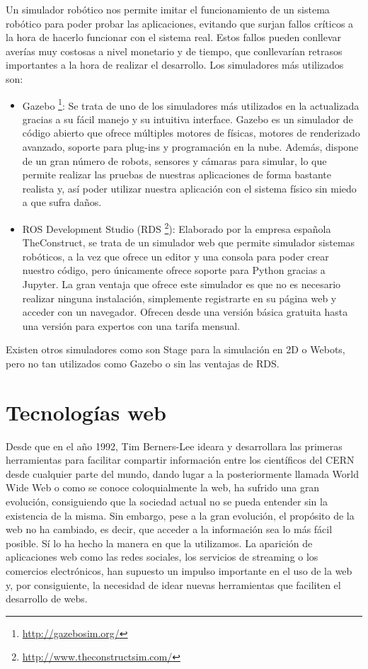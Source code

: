 Un simulador robótico nos permite imitar el funcionamiento de un sistema robótico para poder probar las aplicaciones, evitando que surjan fallos críticos a la hora de hacerlo funcionar con el sistema real. Estos fallos pueden conllevar averías muy costosas a nivel monetario y de tiempo, que conllevarían retrasos importantes a la hora de realizar el desarrollo. Los simuladores más utilizados son:
\begin{itemize}
	\item Gazebo \footnote{\url{http://gazebosim.org/}}: Se trata de uno de los simuladores más utilizados en la actualizada gracias a su fácil manejo y su intuitiva interface. Gazebo es un simulador de código abierto que ofrece múltiples motores de físicas, motores de renderizado avanzado, soporte para plug-ins y programación en la nube. Además, dispone de un gran número de robots, sensores y cámaras para simular, lo que permite realizar las pruebas de nuestras aplicaciones de forma bastante realista y, así poder utilizar nuestra aplicación con el sistema físico sin miedo a que sufra daños.
	\item ROS Development Studio (RDS \footnote{\url{http://www.theconstructsim.com/}}): Elaborado por la empresa española TheConstruct, se trata de un simulador web que permite simulador sistemas robóticos, a la vez que ofrece un editor y una consola para poder crear nuestro código, pero únicamente ofrece soporte para Python gracias a Jupyter. La gran ventaja que ofrece este simulador es que no es necesario realizar ninguna instalación, simplemente registrarte en su página web y acceder con un navegador. Ofrecen desde una versión básica gratuita hasta una versión para expertos con una tarifa mensual.
\end{itemize}
Existen otros simuladores como son Stage para la simulación en 2D o  Webots, pero no tan utilizados como Gazebo o sin las ventajas de RDS.

\section{Tecnologías web}
Desde que en el año 1992, Tim Berners-Lee ideara y desarrollara las primeras herramientas para facilitar compartir información entre los científicos del CERN desde cualquier parte del mundo, dando lugar a la posteriormente llamada World Wide Web o como se conoce coloquialmente la web, ha sufrido una gran evolución, consiguiendo que la sociedad actual no se pueda entender sin la existencia de la misma. Sin embargo, pese a la gran evolución, el propósito de la web no ha cambiado, es decir, que acceder a la información sea lo más fácil posible. Sí lo ha hecho la manera en que la utilizamos. La aparición de aplicaciones web como las redes sociales, los servicios de streaming o los comercios electrónicos, han supuesto un impulso importante en el uso de la web y, por consiguiente, la necesidad de idear nuevas herramientas que faciliten el desarrollo de webs.

